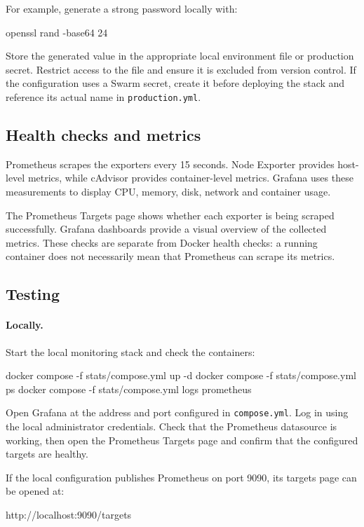 For example, generate a strong password locally with:
\begin{shell}
openssl rand -base64 24
\end{shell}

Store the generated value in the appropriate local environment file
or production secret. Restrict access to the file and ensure it is
excluded from version control. If the configuration uses a Swarm
secret, create it before deploying the stack and reference its
actual name in \texttt{production.yml}.

\subsection{Health checks and metrics}
Prometheus scrapes the exporters every 15 seconds. Node Exporter
provides host-level metrics, while cAdvisor provides container-level
metrics. Grafana uses these measurements to display CPU, memory,
disk, network and container usage.

The Prometheus Targets page shows whether each exporter is being
scraped successfully. Grafana dashboards provide a visual overview
of the collected metrics. These checks are separate from Docker
health checks: a running container does not necessarily mean that
Prometheus can scrape its metrics.

\subsection{Testing}
\paragraph{Locally.}
Start the local monitoring stack and check the containers:
\begin{shell}
docker compose -f stats/compose.yml up -d
docker compose -f stats/compose.yml ps
docker compose -f stats/compose.yml logs prometheus
\end{shell}

Open Grafana at the address and port configured in
\texttt{compose.yml}. Log in using the local administrator credentials.
Check that the Prometheus datasource is working, then open the
Prometheus Targets page and confirm that the configured targets are
healthy.

If the local configuration publishes Prometheus on port 9090, its
targets page can be opened at:
\begin{shell}
http://localhost:9090/targets
\end{shell}

